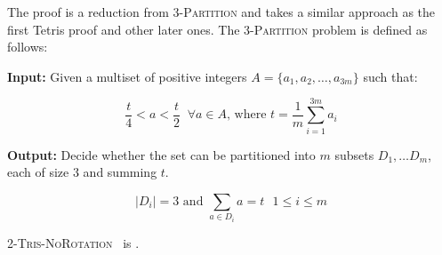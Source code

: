 The proof is a reduction from \textsc{3-Partition} and takes a similar approach as the first Tetris proof\cite{TIH} and other later ones\cite{TT, TWFP, TCB, CTV}. The \textsc{3-Partition} problem is defined as follows:

\textbf{Input:} Given a multiset of positive integers $A = \{ a_1, a_2, \dots, a_{3m} \}$ such that:

$$ \frac{t}{4} < a < \frac{t}{2}\;\; \forall a \in A \text{, where } t = \frac{1}{m} \sum_{i=1}^{3m} a_i $$ 

\textbf{Output:} Decide whether the set can be partitioned into $m$ subsets $D_1, \dots D_m$, each of size $3$ and summing $t$. 

$$ | D_i | = 3 \text{ and } \sum_{a \in D_i} a = t\text{   } 1 \leq i \leq m$$

\begin{theorem} 
  \textsc{2-{Tris-NoRotation}} \clearing\ is \npc.
\end{theorem}

